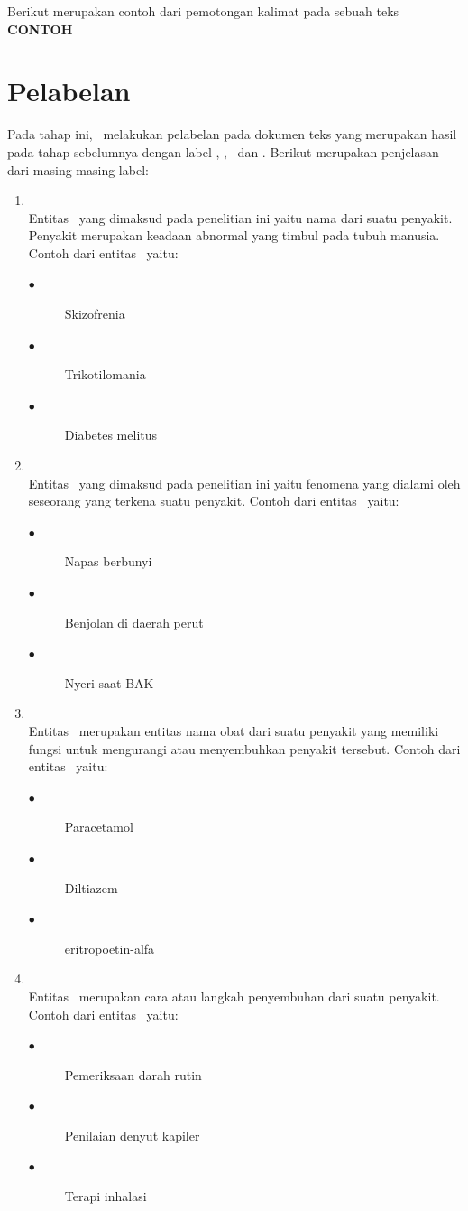 Berikut merupakan contoh dari pemotongan kalimat pada sebuah teks
\textbf{CONTOH}

\section{Pelabelan}
Pada tahap ini, \saya~melakukan pelabelan pada dokumen teks yang merupakan hasil pada tahap sebelumnya dengan label \disease, \symptom, \drug~dan \treatment. Berikut merupakan penjelasan dari masing-masing label:
\begin{enumerate}
	\item \Disease\\
	Entitas \disease~yang dimaksud pada penelitian ini yaitu nama dari suatu penyakit. Penyakit merupakan keadaan abnormal yang timbul pada tubuh manusia. Contoh dari entitas \disease~yaitu:
	\begin{description}
		\item[$\bullet$] Skizofrenia
		\item[$\bullet$] Trikotilomania
		\item[$\bullet$] Diabetes melitus
	\end{description}

	\item \Symptom\\
	Entitas \symptom~yang dimaksud pada penelitian ini yaitu fenomena yang dialami oleh seseorang yang terkena suatu penyakit. Contoh dari entitas \symptom~yaitu:
	\begin{description}
		\item[$\bullet$] Napas berbunyi
		\item[$\bullet$] Benjolan di daerah perut
		\item[$\bullet$] Nyeri saat BAK
	\end{description}

	\item \Drug\\
	Entitas \drug~merupakan entitas nama obat dari suatu penyakit yang memiliki fungsi untuk mengurangi atau menyembuhkan penyakit tersebut. Contoh dari entitas \drug~yaitu:
	\begin{description}
		\item[$\bullet$] Paracetamol
		\item[$\bullet$] Diltiazem
		\item[$\bullet$] eritropoetin-alfa
	\end{description}

	\item \Treatment\\
	Entitas \treatment~merupakan cara atau langkah penyembuhan dari suatu penyakit. Contoh dari entitas \treatment~yaitu:
	\begin{description}
		\item[$\bullet$] Pemeriksaan darah rutin
		\item[$\bullet$] Penilaian denyut kapiler
		\item[$\bullet$] Terapi inhalasi
	\end{description}
\end{enumerate}
